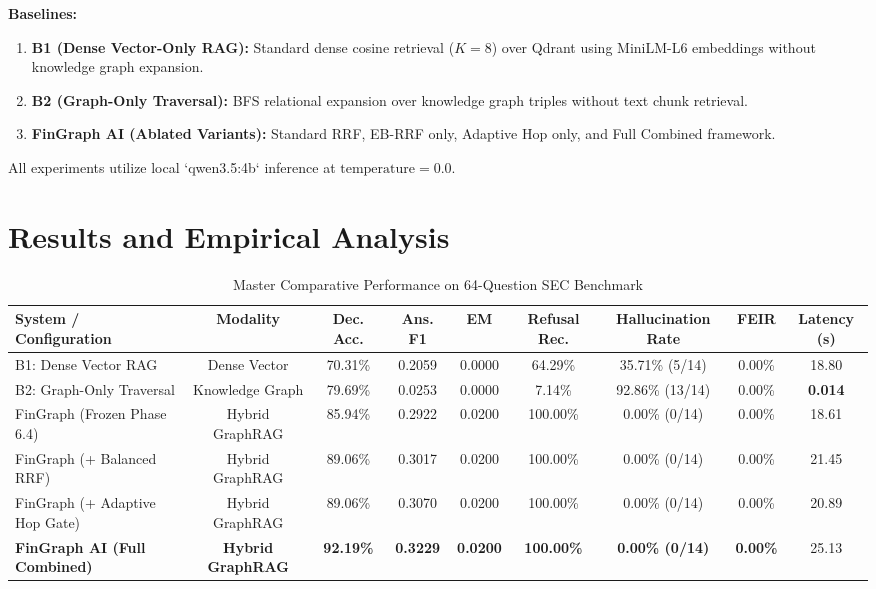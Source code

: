 \documentclass[conference]{IEEEtran}
\begin{document}
\textbf{Baselines:}
\begin{enumerate}
    \item \textbf{B1 (Dense Vector-Only RAG):} Standard dense cosine retrieval ($K=8$) over Qdrant using MiniLM-L6 embeddings without knowledge graph expansion.
    \item \textbf{B2 (Graph-Only Traversal):} BFS relational expansion over knowledge graph triples without text chunk retrieval.
    \item \textbf{FinGraph AI (Ablated Variants):} Standard RRF, EB-RRF only, Adaptive Hop only, and Full Combined framework.
\end{enumerate}

All experiments utilize local `qwen3.5:4b` inference at $\text{temperature} = 0.0$.

\section{Results and Empirical Analysis}

\begin{table}[t]
\caption{Master Comparative Performance on 64-Question SEC Benchmark}
\label{tab:master_results}
\centering
\begin{tabular}{lcccccccc}
\toprule
\textbf{System / Configuration} & \textbf{Modality} & \textbf{Dec. Acc.} & \textbf{Ans. F1} & \textbf{EM} & \textbf{Refusal Rec.} & \textbf{Hallucination Rate} & \textbf{FEIR} & \textbf{Latency (s)} \\
\midrule
B1: Dense Vector RAG & Dense Vector & 70.31\% & 0.2059 & 0.0000 & 64.29\% & 35.71\% (5/14) & 0.00\% & 18.80 \\
B2: Graph-Only Traversal & Knowledge Graph & 79.69\% & 0.0253 & 0.0000 & 7.14\% & 92.86\% (13/14) & 0.00\% & \textbf{0.014} \\
\midrule
FinGraph (Frozen Phase 6.4) & Hybrid GraphRAG & 85.94\% & 0.2922 & 0.0200 & 100.00\% & 0.00\% (0/14) & 0.00\% & 18.61 \\
FinGraph (+ Balanced RRF) & Hybrid GraphRAG & 89.06\% & 0.3017 & 0.0200 & 100.00\% & 0.00\% (0/14) & 0.00\% & 21.45 \\
FinGraph (+ Adaptive Hop Gate) & Hybrid GraphRAG & 89.06\% & 0.3070 & 0.0200 & 100.00\% & 0.00\% (0/14) & 0.00\% & 20.89 \\
\textbf{FinGraph AI (Full Combined)} & \textbf{Hybrid GraphRAG} & \textbf{92.19\%} & \textbf{0.3229} & \textbf{0.0200} & \textbf{100.00\%} & \textbf{0.00\% (0/14)} & \textbf{0.00\%} & 25.13 \\
\bottomrule
\end{tabular}
\end{table}
\end{document}
